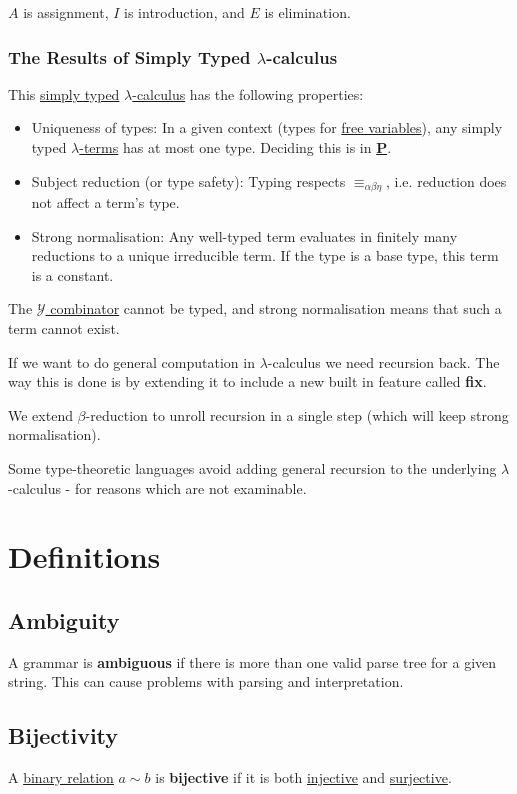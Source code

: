 \documentclass{article}
\begin{document}
$A$ is assignment, $I$ is introduction, and $E$ is elimination.

\subsubsection{The Results of Simply Typed $\lambda$-calculus}
This \hyperref[types]{simply typed} \hyperref[lambda-calculus]{$\lambda$-calculus} has the following properties:
\begin{itemize}
    \item Uniqueness of types: In a given context (types for \hyperref[free-variables]{free variables}), any simply typed \hyperref[lambda-term]{$\lambda$-terms} has at most one type. Deciding this is in \hyperref[P]{\textbf{P}}.
    \item Subject reduction (or type safety): Typing respects \hyperref[equivalence]{$\equiv_{\alpha\beta\eta}$}, i.e. reduction does not affect a term's type.
    \item Strong normalisation: Any well-typed term evaluates in finitely many reductions to a unique irreducible term. If the type is a base type, this term is a constant.
\end{itemize}

The \hyperref[y-combinator]{$\mathcal{Y}$ combinator} cannot be typed, and strong normalisation means that such a term cannot exist.

If we want to do general computation in $\lambda$-calculus we need recursion back. The way this is done is by extending it to include a new built in feature called \textbf{fix}.

We extend $\beta$-reduction to unroll recursion in a single step (which will keep strong normalisation). 

Some type-theoretic languages avoid adding general recursion to the underlying $\lambda$-calculus - for reasons which are not examinable.

\newpage
\section{Definitions}
\subsection{Ambiguity}\label{ambiguity}
A grammar is \textbf{ambiguous} if there is more than one valid parse tree for a given string. This can cause problems with parsing and interpretation.


\subsection{Bijectivity}\label{bijection}
A \hyperref[binary-relation]{binary relation} $a \sim b$ is \textbf{bijective} if it is both \hyperref[injective]{injective} and \hyperref[surjective]{surjective}.
\end{document}
